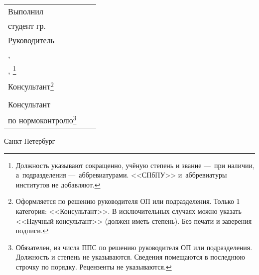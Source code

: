 \noindent
\begin{tabularx}{\linewidth}{lXl}
	Выполнил                                                                                                                                                                                                                                    &  &                  \\
	студент гр.~\group                                                                                                                                                                                                                          &  & \Author          \\[\mfloatsep]

	Руководитель                                                                                                                                                                                                                                &  &                  \\
	\SupervisorJob,                                                                                                                                                                                                                             &  &                  \\
	\SupervisorDegree, \SupervisorTitle\footnote{Должность указывают сокращенно, учёную степень и звание ---~при наличии, а~подразделения ---~аббревиатурами. <<СПбПУ>> и~аббревиатуры институтов не добавляют.}                                &  & \Supervisor      \\[\mfloatsep]

	Консультант\footnote{Оформляется по решению руководителя ОП или подразделения. Только 1 категория: <<Консультант>>. В исключительных случаях можно указать <<Научный консультант>> (должен иметь степень). Без печати и заверения подписи.} &  &                  \\
	\ConsultantExtraDegree                                                                                                                                                                                                                      &  & \ConsultantExtra \\[\mfloatsep]

	Консультант                                                                                                                                                                                                                                 &  &                  \\
	по нормоконтролю\footnote{Обязателен, из числа ППС по решению руководителя ОП или подразделения. Должность и степень не указываются. Сведения помещаются в последнюю строчку по порядку. Рецензенты не указываются.}                        &  & \ConsultantNorm  %
\end{tabularx} %


%
\vspace{0pt plus4fill}%


\begin{center}%
	Санкт-Петербург\\
	\thesisYear
\end{center}%
\restoregeometry
\newpage
